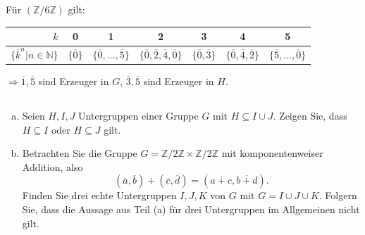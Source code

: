 \documentclass{article}
\newcommand{\N}{\mathbb{N}}
\newcommand{\Z}{\mathbb{Z}}
\begin{document}
\begin{enumerate}[(a)]
        Für $(\Z/6\Z)$ gilt:
        \begin{tabular}{r|cccccc}
            $k$&0&1&2&3&4&5\\
            \hline
            $\{\overline{k}^n|n\in\N\}$&
            $\{\overline{0}\}$&
            $\{\overline{0},\hdots,\overline{5}\}$&
            $\{\overline{0},\overline{2},\overline{4},\overline{0}\}$&
            $\{\overline{0},\overline{3}\}$&
            $\{\overline{0},\overline{4},\overline{2}\}$&
            $\{\overline{5},\hdots,\overline{0}\}$
        \end{tabular}
        $\Rightarrow\overline{1},\overline{5}$ sind Erzeuger in $G$, $\overline{3},\overline{5}$ sind Erzeuger
        in $H$.
\end{enumerate}
\subsection{}
\begin{enumerate}[(a)]
    \item
        \color{blue}
        Seien $H, I, J$ Untergruppen einer Gruppe $G$ mit
        $H \subseteq I \cup J$. Zeigen Sie, dass $H \subseteq I$ oder
        $H \subseteq J$ gilt.
        \color{black}
    \item
        \color{blue}
        Betrachten Sie die Gruppe $G = \Z/2\Z \times \Z/2\Z$ mit
        komponentenweiser Addition, also
        \[
        (\overline{a},\overline{b}) + (\overline{c},\overline{d}) = (\overline{a+c}, \overline{b+d}).
        \]
        Finden Sie drei echte Untergruppen $I, J, K$ von $G$ mit
        $G = I \cup J \cup K$. Folgern Sie, dass die Aussage aus Teil (a)
        für drei Untergruppen im Allgemeinen nicht gilt.
        \color{black}
\end{enumerate}
\end{document}
